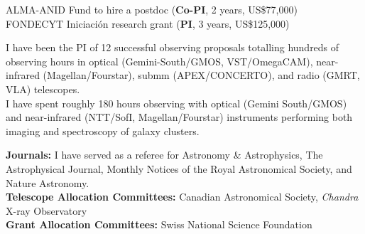 \documentclass[11pt]{article}
\begin{document}
\hline



\noindent
{} ALMA-ANID Fund to hire a postdoc (\textbf{Co-PI}, 2 years, US\$77,000)\\
 FONDECYT Iniciaci\'on research grant (\textbf{PI}, 3 years, US\$125,000)



%

\noindent
I have been the PI of 12 successful observing proposals totalling hundreds of 
observing hours in optical (Gemini-South/GMOS, VST/OmegaCAM), near-infrared 
(Magellan/Fourstar), submm (APEX/CONCERTO), and radio (GMRT, VLA) telescopes.\\

{I have spent roughly 180 hours observing with 
optical (Gemini South/GMOS) and near-infrared (NTT/SofI, Magellan/Fourstar) instruments performing both 
imaging and spectroscopy of galaxy clusters.}


%


\noindent 
\textbf{Journals:} I have served as a referee for Astronomy \& Astrophysics, The 
    Astrophysical Journal, Monthly Notices of the Royal
    Astronomical Society, and Nature Astronomy.\\
\noindent
\textbf{Telescope Allocation Committees:}
Canadian Astronomical Society, \textit{Chandra} X-ray Observatory\\
\noindent
\textbf{Grant Allocation Committees:} Swiss National Science Foundation
\end{document}
